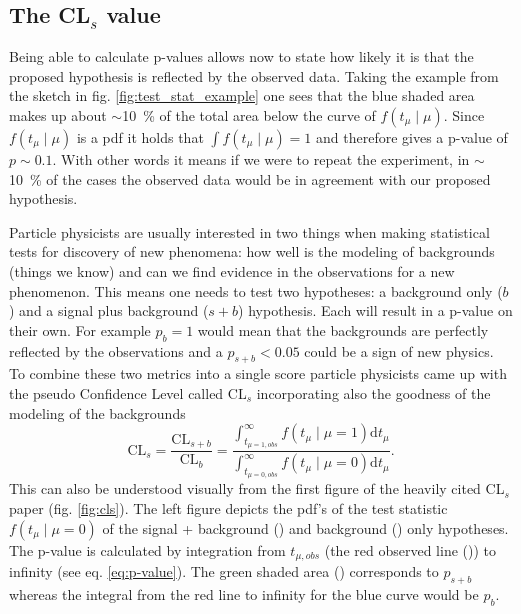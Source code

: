 \subsection{The CL$_s$ value}\label{sec:cls}
Being able to calculate p-values allows now to state how likely it is that the proposed hypothesis is reflected by the observed data. Taking the example from the sketch in fig. \ref{fig:test_stat_example} one sees that the blue shaded area makes up about $\sim$\SI{10}{\percent} of the total area below the curve of $f(t_\mu \mid \mu)$. Since $f(t_\mu \mid \mu)$ is a pdf it holds that $\int f(t_\mu \mid \mu) =1$ and therefore gives a p-value of $p\sim 0.1$. With other words it means if we were to repeat the experiment, in $\sim$\SI{10}{\percent} of the cases the observed data would be in agreement with our proposed hypothesis. 

Particle physicists are usually interested in two things when making statistical tests for discovery of new phenomena: how well is the modeling of backgrounds (things we know) and can we find evidence in the observations for a new phenomenon. This means one needs to test two hypotheses: a background only ($b$) and a signal plus background ($s+b$) hypothesis. Each will result in a p-value on their own. For example $p_{b}=1$ would mean that the backgrounds are perfectly reflected by the observations and a $p_{s+b} < 0.05$ could be a sign of new physics. To combine these two metrics into a single score particle physicists came up with the pseudo Confidence Level called CL$_s$ incorporating also the goodness of the modeling of the backgrounds 
\begin{equation}
    \mathrm{CL}_s=\frac{\mathrm{CL}_{s+b}}{\mathrm{CL}_{b}}=
    \frac
    {\int_{t_{\mu=1 ,obs}}^{\infty} 
    f(t_\mu \mid \mu=1) \mathrm{d}t_\mu}
    {\int_{t_{\mu=0 ,obs}}^{\infty} 
    f(t_\mu \mid \mu=0) \mathrm{d}t_\mu}.
\end{equation}
This can also be understood visually from the first figure of the heavily cited CL$_s$ paper \citep{read2002presentation} (fig. \ref{fig:cls}). The left figure depicts the pdf's of the test statistic $ f(t_\mu \mid \mu=0)$ of the signal + background ({\color[HTML]{804000}{$\diagup$}}) and background ({\color[HTML]{2100FF}{$\diagup$}}) only hypotheses. The p-value is calculated by integration from $t_{\mu,obs}$ (the red observed line ({\color[HTML]{FF0000}{$\diagup$}})) to infinity (see eq. \ref{eq:p-value}). The green shaded area () corresponds to $p_{s+b}$ whereas the integral from the red line to infinity for the blue curve would be $p_b$. 

